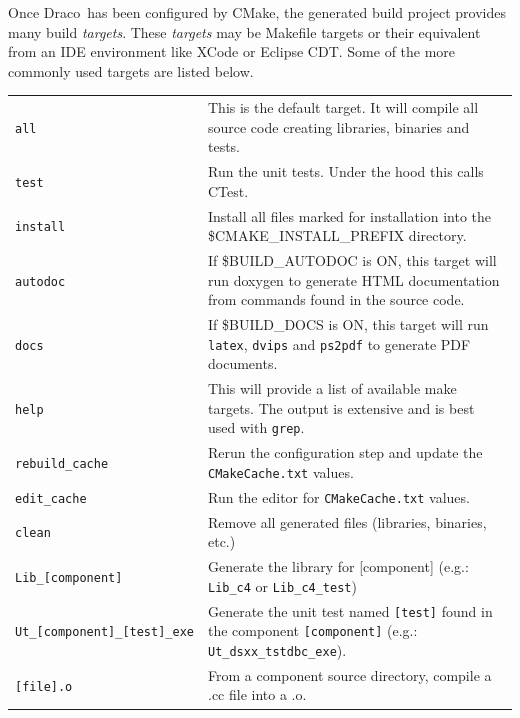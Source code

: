 \documentclass[note]{ResearchNote_pdf}
\newcommand{\draco}{Draco}
\newcommand{\cmake}{\textsf{CMake}}
\newcommand{\ctest}{\textsf{CTest}}
\newcommand{\tableText}[1]{{\raggedright #1}}
\begin{document}
Once \draco\ has been configured by \cmake, the generated build
project provides many build \textit{targets}.  These \textit{targets}
may be \textsf{Makefile} targets or their equivalent from an IDE
environment like \textsf{XCode} or \textsf{Eclipse CDT}.  Some of the
more commonly used targets are listed below. 

\begin{center}
  \footnotesize
  \begin{tabular}{lp{4.0in}}
    \hline\hline

   \texttt{all} & \tableText{This is the default target.  It will
     compile all source code creating libraries, binaries and tests.} \\
   \texttt{test} & \tableText{Run the unit tests.  Under the hood this
   calls \ctest.} \\
   \texttt{install} & \tableText{Install all files marked for
     installation into the \$CMAKE\_INSTALL\_PREFIX directory.} \\
   \texttt{autodoc} & \tableText{If \$BUILD\_AUTODOC is ON, this
     target will run doxygen to generate HTML documentation from
     commands found in the source code.} \\
   \texttt{docs} & \tableText{If \$BUILD\_DOCS is ON, this target will
     run \texttt{latex}, \texttt{dvips} and \texttt{ps2pdf} to
     generate PDF documents.} \\
   \texttt{help} & \tableText{This will provide a list of available
     make targets.  The output is extensive and is best used with
     \texttt{grep}.} \\ 
   \texttt{rebuild\_cache} & \tableText{Rerun the configuration step
     and update the \texttt{CMakeCache.txt} values.} \\ 
   \texttt{edit\_cache} & \tableText{Run the editor for \texttt{CMakeCache.txt} values.} \\ 
   \texttt{clean} & \tableText{Remove all generated files (libraries,
     binaries, etc.) }  \\
   
   \hline %

   \texttt{Lib\_[component]} & \tableText{Generate the library for
     [component] (e.g.: \texttt{Lib\_c4} or \texttt{Lib\_c4\_test})} \\
   \texttt{Ut\_[component]\_[test]\_exe} & \tableText{Generate the
     unit test named \texttt{[test]} found in the component
     \texttt{[component]} (e.g.: \texttt{Ut\_dsxx\_tstdbc\_exe}).} \\
   \texttt{[file].o} & \tableText{From a component source directory,
     compile a .cc file into a .o.} \\

    \hline\hline 
  \end{tabular}
\end{center}
\end{document}
